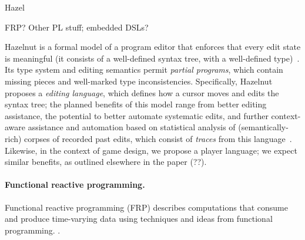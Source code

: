 Hazel

FRP? Other PL stuff; embedded DSLs?

Hazelnut is a formal model of a program editor that enforces that
every edit state is meaningful (it consists of a well-defined syntax
tree, with a well-defined type)~\cite{Omar17Hazelnut}.
%
Its type system and editing semantics permit \emph{partial programs},
which contain missing pieces and well-marked type inconsistencies.
%
Specifically, Hazelnut proposes a \emph{editing language}, which
defines how a cursor moves and edits the syntax tree; the planned
benefits of this model range from better editing assistance, the
potential to better automate systematic edits, and further
context-aware assistance and automation based on statistical analysis
of (semantically-rich) corpses of recorded past edits, which consist
of \emph{traces} from this language~\cite{Omar17Hazel}.
%
Likewise, in the context of game design, we propose a player language;
we expect similar benefits, as outlined elsewhere in the paper (??).

\paragraph{Functional reactive programming.}
%
Functional reactive programming (FRP) describes computations that
consume and produce time-varying data using techniques and ideas from
functional programming.
%
\citep{Fran,HudakEtAl,Cooper06embeddingdynamic,Krishnaswami11,Krishnaswami13,Czaplicki2013AFR}.


